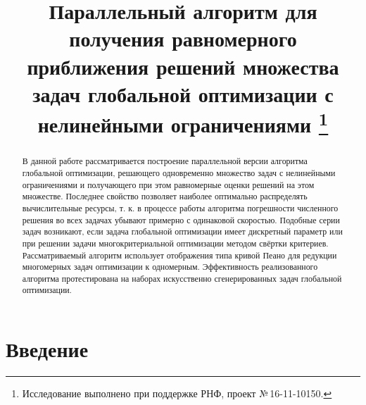 \documentclass[11pt, oneside, a4paper]{article}
\begin{document}

\title{Параллельный алгоритм для получения равномерного приближения решений множества задач глобальной оптимизации с нелинейными ограничениями
\footnote{Исследование выполнено при поддержке РНФ, проект №\,16-11-10150.}}


\begin{abstract}
В данной работе рассматривается построение параллельной версии алгоритма глобальной оптимизации, решающего одновременно множество задач с нелинейными ограничениями и получающего при этом равномерные оценки решений на этом множестве. Последнее свойство позволяет наиболее оптимально распределять вычислительные ресурсы, т. к. в процессе работы алгоритма погрешности численного решения во всех задачах убывают примерно с одинаковой скоростью. Подобные серии задач возникают, если задача глобальной оптимизации имеет дискретный параметр или при решении задачи многокритериальной оптимизации методом свёртки критериев. Рассматриваемый алгоритм использует отображения типа кривой Пеано для редукции многомерных задач оптимизации к одномерным. Эффективность реализованного алгоритма протестирована на наборах искусственно сгенерированных задач глобальной оптимизации.
\end{abstract}



\section{Введение}
\end{document}
